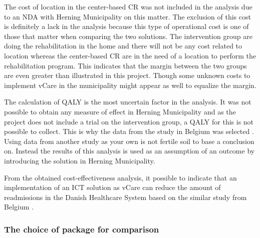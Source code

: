 The cost of location in the center-based CR was not included in the analysis due to an NDA with Herning Municipality on this matter. The exclusion of this cost is definitely a lack in the analysis because this type of operational cost is one of those that matter when comparing the two solutions. The intervention group are doing the rehabilitation in the home and there will not be any cost related to location whereas the center-based CR are in the need of a location to perform the rehabilitation program. This indicates that the margin between the two groups are even greater than illustrated in this project. Though some unknown costs to implement vCare in the municipality might appear as well to equalize the margin. 

The calculation of QALY is the most uncertain factor in the analysis. It was not possible to obtain any measure of effect in Herning Municipality and as the project does not include a trial on the intervention group, a QALY for this is not possible to collect. This is why the data from the study in Belgium was selected \cite{costeffect}. Using data from another study as your own is not fertile soil to base a conclusion on. Instead the results of this analysis is used as an assumption of an outcome by introducing the solution in Herning Municipality. 

From the obtained cost-effectiveness analysis, it possible to indicate that an implementation of an ICT solution as vCare can reduce the amount of readmissions in the Danish Healthcare System based on the similar study from Belgium \cite{costeffect}.

\subsubsection{The choice of package for comparison}

